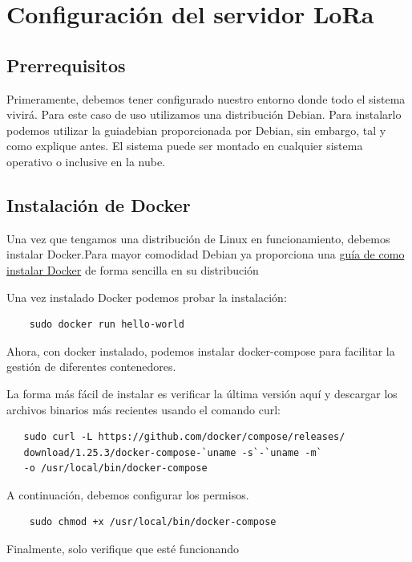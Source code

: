 \section{Configuración del servidor LoRa}
 \subsection{Prerrequisitos}

Primeramente, debemos tener configurado nuestro entorno donde todo el sistema vivirá. Para este caso
de uso utilizamos una distribución Debian. Para instalarlo podemos utilizar la \gls{guiadebian}
proporcionada por Debian, sin embargo, tal y como explique antes. El sistema puede ser montado en
cualquier sistema operativo o inclusive en la nube.

\subsection{Instalación de Docker}

Una vez que tengamos una distribución de Linux en funcionamiento, debemos instalar Docker.Para mayor
comodidad Debian ya proporciona una \href{https://docs.docker.com/engine/install/debian/}{guía de
como instalar Docker} de forma sencilla en su distribución

Una vez instalado Docker podemos probar la instalación:

\begin{lstlisting}
    sudo docker run hello-world
\end{lstlisting}

Ahora, con docker instalado, podemos instalar docker-compose para facilitar la gestión de diferentes
contenedores.

La forma más fácil de instalar es verificar la última versión aquí y descargar los archivos binarios
más recientes usando el comando curl:

\begin{lstlisting}
   sudo curl -L https://github.com/docker/compose/releases/
   download/1.25.3/docker-compose-`uname -s`-`uname -m` 
   -o /usr/local/bin/docker-compose
\end{lstlisting}

A continuación, debemos configurar los permisos.

\begin{lstlisting}
    sudo chmod +x /usr/local/bin/docker-compose
\end{lstlisting}

Finalmente, solo verifique que esté funcionando


